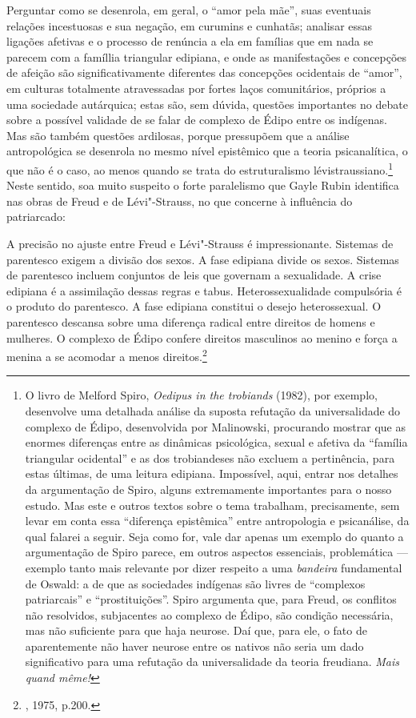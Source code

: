 Perguntar como se desenrola, em geral, o ``amor pela mãe'', suas
eventuais relações incestuosas e sua negação, em curumins e cunhatãs;
analisar essas ligações afetivas e o processo de renúncia a ela em
famílias que em nada se parecem com a famíllia triangular edipiana, e
onde as manifestações e concepções de afeição são significativamente
diferentes das concepções ocidentais de ``amor'', em culturas totalmente
atravessadas por fortes laços comunitários, próprios a uma sociedade
autárquica; estas são, sem dúvida, questões importantes no debate sobre
a possível validade de se falar de complexo de Édipo entre os indígenas.
Mas são também questões ardilosas, porque pressupõem que a análise
antropológica se desenrola no mesmo nível epistêmico que a teoria
psicanalítica, o que não é o caso, ao menos quando se trata do
estruturalismo lévistraussiano.\footnote{O livro de Melford Spiro,
  \emph{Oedipus in the trobiands} (1982), por exemplo, desenvolve uma
  detalhada análise da suposta refutação da universalidade do complexo
  de Édipo, desenvolvida por Malinowski, procurando mostrar que as
  enormes diferenças entre as dinâmicas psicológica, sexual e afetiva da
  ``família triangular ocidental'' e as dos trobiandeses não excluem a
  pertinência, para estas últimas, de uma leitura edipiana. Impossível,
  aqui, entrar nos detalhes da argumentação de Spiro, alguns
  extremamente importantes para o nosso estudo. Mas este e outros textos
  sobre o tema trabalham, precisamente, sem levar em conta essa
  ``diferença epistêmica'' entre antropologia e psicanálise, da qual
  falarei a seguir. Seja como for, vale dar apenas um exemplo do quanto
  a argumentação de Spiro parece, em outros aspectos essenciais,
  problemática --- exemplo tanto mais relevante por dizer respeito a uma
  \emph{bandeira} fundamental de Oswald: a de que as sociedades
  indígenas são livres de ``complexos patriarcais'' e ``prostituições''.
  Spiro argumenta que, para Freud, os conflitos não resolvidos,
  subjacentes ao complexo de Édipo, são condição necessária, mas não
  suficiente para que haja neurose. Daí que, para ele, o fato de
  aparentemente não haver neurose entre os nativos não seria um dado
  significativo para uma refutação da universalidade da teoria
  freudiana. \emph{Mais quand même!}} Neste sentido, soa muito suspeito
o forte paralelismo que Gayle Rubin identifica nas obras de Freud e de
Lévi"-Strauss, no que concerne à influência do patriarcado:

A precisão no ajuste entre Freud e Lévi"-Strauss é impressionante.
Sistemas de parentesco exigem a divisão dos sexos. A fase edipiana
divide os sexos. Sistemas de parentesco incluem conjuntos de leis que
governam a sexualidade. A crise edipiana é a assimilação dessas regras e
tabus. Heterossexualidade compulsória é o produto do parentesco. A fase
edipiana constitui o desejo heterossexual. O parentesco descansa sobre
uma diferença radical entre direitos de homens e mulheres. O complexo de
Édipo confere direitos masculinos ao menino e força a menina a se
acomodar a menos direitos.\footnote{, 1975, p.200.}


